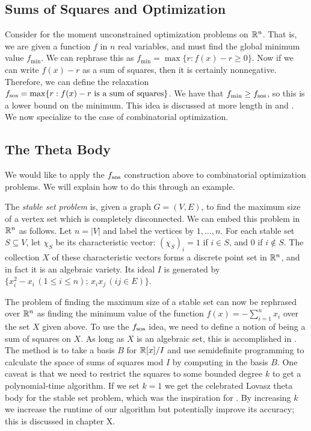 \subsection{Sums of Squares and Optimization}
Consider for the moment unconstrained optimization problems on $\mathbb{R}^n$. That 
is, we are given a function $f$ in $n$ real variables, and must find the 
global minimum value $f_{\min}$. We can rephrase this as $f_{\min} = 
\max \{r: f(x) - r \ge 0\}$. Now if we can write $f(x) - r$ as a sum of squares,
then it is certainly nonnegative. Therefore, we can define the relaxation
$f_{\textup{sos}} = \max \{r: f(x) - r \textup{ is a sum of squares}\}$.
We have that $f_{\min} \ge f_{\textup{sos}}$, so this is a lower bound on
the minimum. This idea is discussed at more length in \cite{sostools} and 
\cite{lasserre}. We now specialize to the case of combinatorial optimization.

\subsection{The Theta Body}
We would like to apply the $f_{\textup{sos}}$ construction above to
combinatorial optimization problems. We will explain how to do this through
an example.

The {\em stable set problem} is, given a graph $G = (V,E)$, to find the
maximum size of a vertex set which is completely disconnected. We can embed
this problem in $\mathbb{R}^n$ as follows. Let $n = |V|$ and label the vertices by 
$1, \ldots, n$. For each stable set $S \subseteq V$, let $\chi_S$ be its 
characteristic vector: $(\chi_S)_i = 1$ if $i \in S$, and 0 if $i \notin S$.
The collection $X$ of these characteristic vectors forms a discrete point set
in $\mathbb{R}^n$, and in fact it is an algebraic variety. Its ideal
$I$ is generated by $\{x_i^2 - x_i \, (1\le i \le n);\, x_ix_j\, (ij \in E) \}$.

The problem of finding the maximum size of a stable set can now be rephrased
over $\mathbb{R}^n$ as finding the minimum value of the function
$f(x) = - \sum_{i=1}^n x_i$ over the set $X$ given above. To use the
$f_{\textup{sos}}$ idea, we need to define a notion of being a sum of squares
on $X$. As long as $X$ is an algebraic set, this is accomplished in 
\cite{glpt}. The method is to take a basis $B$ for $\mathbb{R}[x]/I$ and use 
semidefinite programming to calculate the space of sums of squares mod $I$ by
computing in the basis $B$. One caveat is that we need to restrict the 
squares to some bounded degree $k$ to get a polynomial-time algorithm. If
we set $k=1$ we get the celebrated Lovasz theta body for the stable set
problem, which was the inspiration for \cite{glpt}. By increasing $k$ we
increase the runtime of our algorithm but potentially improve its accuracy;
this is discussed in chapter X. 

